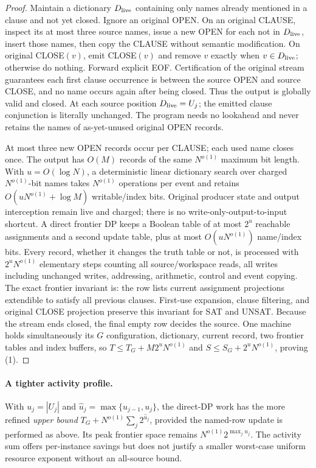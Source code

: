\documentclass[11pt]{article}
\begin{document}
\begin{proof}
Maintain a dictionary $D_{\rm live}$ containing only names already
mentioned in a clause and not yet closed. Ignore an original OPEN.
On an original CLAUSE, inspect its at most three source names, issue
a new OPEN for each not in $D_{\rm live}$, insert those names, then
copy the CLAUSE without semantic modification. On original CLOSE$(v)$,
emit CLOSE$(v)$ and remove $v$ exactly when $v\in D_{\rm live}$;
otherwise do nothing. Forward explicit EOF.
Certification of the original stream guarantees each first clause
occurrence is between the source OPEN and source CLOSE, and no name
occurs again after being closed. Thus the output is globally valid and
closed. At each source position $D_{\rm live}=U_j$; the emitted clause
conjunction is literally unchanged. The program needs no lookahead
and never retains the names of as-yet-unused original OPEN records.

At most three new OPEN records occur per CLAUSE; each used name
closes once. The output has $O(M)$ records of the same $N^{o(1)}$
maximum bit length. With $u=O(\log N)$, a deterministic linear
dictionary search over charged $N^{o(1)}$-bit names takes
$N^{o(1)}$ operations per event and retains
$O(uN^{o(1)}+\log M)$ writable/index bits. Original producer state
and output interception remain live and charged; there is no
write-only-output-to-input shortcut. A direct frontier DP keeps a
Boolean table of at most $2^u$ reachable assignments and a second
update table, plus at most $O(uN^{o(1)})$ name/index bits. Every
record, whether it changes the truth table or not, is processed with
$2^uN^{o(1)}$ elementary steps counting all source/workspace reads,
all writes including unchanged writes, addressing, arithmetic,
control and event copying. The exact frontier invariant is:
the row lists current assignment projections extendible to satisfy
all previous clauses. First-use expansion, clause filtering, and
original CLOSE projection preserve this invariant for SAT and UNSAT.
Because the stream ends closed, the final empty row decides the source.
One machine holds simultaneously its $G$ configuration, dictionary,
current record, two frontier tables and index buffers, so
$T\le T_G+M2^uN^{o(1)}$ and
$S\le S_G+2^uN^{o(1)}$, proving (1).
\end{proof}

\paragraph{A tighter activity profile.}
With $u_j=|U_j|$ and $\widehat u_j=\max\{u_{j-1},u_j\}$,
the direct-DP work has the more refined \emph{upper bound}
$T_G+N^{o(1)}\sum_j2^{\widehat u_j}$, provided the named-row
update is performed as above. Its peak frontier space
remains $N^{o(1)}2^{\max_j u_j}$. The activity sum offers
per-instance savings but does not justify a smaller worst-case
uniform resource exponent without an all-source bound.
\end{document}
